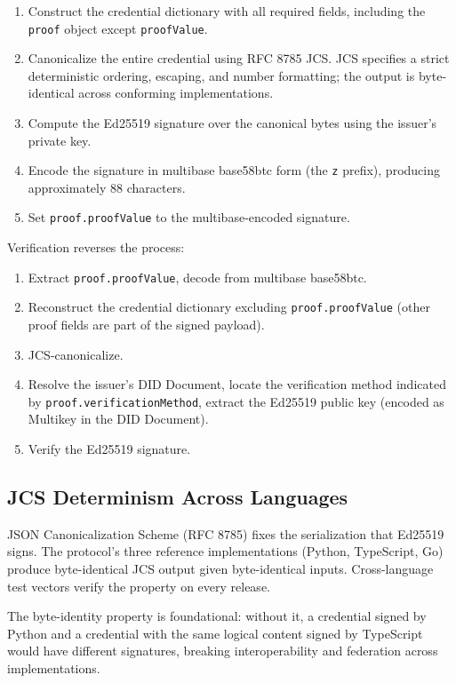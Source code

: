 \documentclass[11pt,a4paper,twocolumn]{article}
\begin{document}
\begin{enumerate}[label=\arabic*.,leftmargin=*]
\item Construct the credential dictionary with all required fields, including the \verb|proof| object except \verb|proofValue|.
\item Canonicalize the entire credential using RFC 8785 JCS. JCS specifies a strict deterministic ordering, escaping, and number formatting; the output is byte-identical across conforming implementations.
\item Compute the Ed25519 signature over the canonical bytes using the issuer's private key.
\item Encode the signature in multibase base58btc form (the \texttt{z} prefix), producing approximately 88 characters.
\item Set \verb|proof.proofValue| to the multibase-encoded signature.
\end{enumerate}

Verification reverses the process:

\begin{enumerate}[label=\arabic*.,leftmargin=*]
\item Extract \verb|proof.proofValue|, decode from multibase base58btc.
\item Reconstruct the credential dictionary excluding \verb|proof.proofValue| (other proof fields are part of the signed payload).
\item JCS-canonicalize.
\item Resolve the issuer's DID Document, locate the verification method indicated by \verb|proof.verificationMethod|, extract the Ed25519 public key (encoded as Multikey in the DID Document).
\item Verify the Ed25519 signature.
\end{enumerate}

\subsection{JCS Determinism Across Languages}

JSON Canonicalization Scheme (RFC 8785) fixes the serialization that Ed25519 signs. The protocol's three reference implementations (Python, TypeScript, Go) produce byte-identical JCS output given byte-identical inputs. Cross-language test vectors verify the property on every release.

The byte-identity property is foundational: without it, a credential signed by Python and a credential with the same logical content signed by TypeScript would have different signatures, breaking interoperability and federation across implementations.
\end{document}
